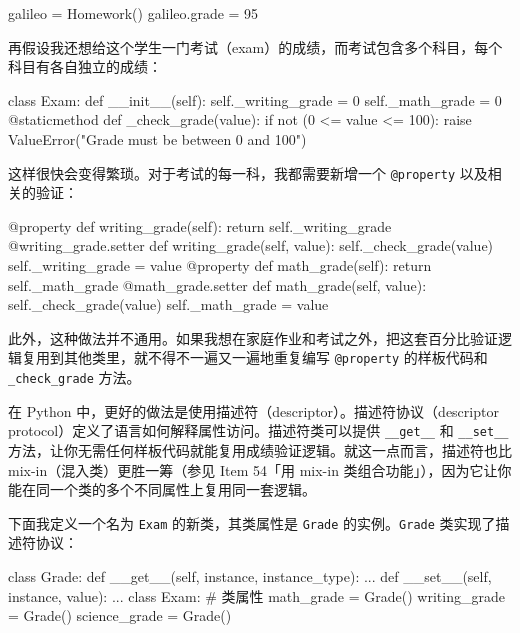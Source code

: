 \begin{codebox}[python]
galileo = Homework()
galileo.grade = 95
\end{codebox}

再假设我还想给这个学生一门考试（exam）的成绩，而考试包含多个科目，每个科目有各自独立的成绩：

\begin{codebox}[python]
class Exam:
    def __init__(self):
        self._writing_grade = 0
        self._math_grade = 0
    @staticmethod
    def _check_grade(value):
        if not (0 <= value <= 100):
            raise ValueError("Grade must be between 0 and 100")
\end{codebox}

这样很快会变得繁琐。对于考试的每一科，我都需要新增一个 \texttt{@property} 以及相关的验证：

\begin{codebox}[python]
    @property
    def writing_grade(self):
        return self._writing_grade
    @writing_grade.setter
    def writing_grade(self, value):
        self._check_grade(value)
        self._writing_grade = value
    @property
    def math_grade(self):
        return self._math_grade
    @math_grade.setter
    def math_grade(self, value):
        self._check_grade(value)
        self._math_grade = value
\end{codebox}

此外，这种做法并不通用。如果我想在家庭作业和考试之外，把这套百分比验证逻辑复用到其他类里，就不得不一遍又一遍地重复编写 \texttt{@property} 的样板代码和 \texttt{\_check\_grade} 方法。

在 Python 中，更好的做法是使用描述符（descriptor）。描述符协议（descriptor protocol）定义了语言如何解释属性访问。描述符类可以提供 \texttt{\_\_get\_\_} 和 \texttt{\_\_set\_\_} 方法，让你无需任何样板代码就能复用成绩验证逻辑。就这一点而言，描述符也比 mix-in（混入类）更胜一筹（参见 Item 54「用 mix-in 类组合功能」），因为它让你能在同一个类的多个不同属性上复用同一套逻辑。

下面我定义一个名为 \texttt{Exam} 的新类，其类属性是 \texttt{Grade} 的实例。\texttt{Grade} 类实现了描述符协议：

\begin{codebox}[python]
class Grade:
    def __get__(self, instance, instance_type):
        ...
    def __set__(self, instance, value):
        ...
class Exam:
    # 类属性
    math_grade = Grade()
    writing_grade = Grade()
    science_grade = Grade()
\end{codebox}

